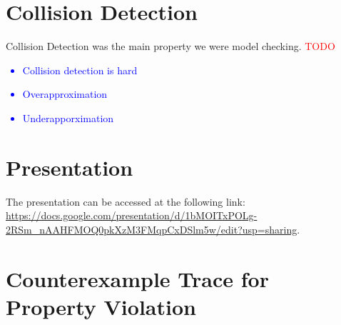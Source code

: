 \documentclass{article}
\begin{document}
\section{Collision Detection}
\label{sec:collision}
Collision Detection was the main property we were model checking.
\textcolor{red}{
    TODO
}
\textcolor{blue}{
    \begin{itemize}
        \item Collision detection is hard
        \item Overapproximation
        \item Underapporximation
    \end{itemize}
}

\section{Presentation}
The presentation can be accessed at the following link: \url{https://docs.google.com/presentation/d/1bMOITxPOLg-2RSm_nAAHFMOQ0pkXzM3FMqpCxDSlm5w/edit?usp=sharing}.




\appendix
\section{Counterexample Trace for Property Violation}
\label{appendix:trace}

\end{document}
